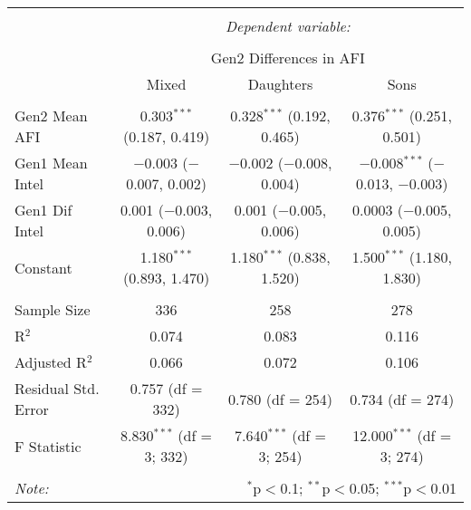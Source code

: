 
\begingroup 
\small 
\begin{tabular}{@{\extracolsep{1pt}}lccc} 
\\[-1.8ex]\hline 
\hline \\[-1.8ex] 
 & \multicolumn{3}{c}{\textit{Dependent variable:}} \\ 
\cline{2-4} 
\\[-1.8ex] & \multicolumn{3}{c}{Gen2 Differences in AFI} \\ 
 & Mixed & Daughters & Sons \\ 
\hline \\[-1.8ex] 
 Gen2 Mean AFI & 0.303$^{***}$ (0.187, 0.419) & 0.328$^{***}$ (0.192, 0.465) & 0.376$^{***}$ (0.251, 0.501) \\ 
  Gen1 Mean Intel & $-$0.003 ($-$0.007, 0.002) & $-$0.002 ($-$0.008, 0.004) & $-$0.008$^{***}$ ($-$0.013, $-$0.003) \\ 
  Gen1 Dif Intel & 0.001 ($-$0.003, 0.006) & 0.001 ($-$0.005, 0.006) & 0.0003 ($-$0.005, 0.005) \\ 
  Constant & 1.180$^{***}$ (0.893, 1.470) & 1.180$^{***}$ (0.838, 1.520) & 1.500$^{***}$ (1.180, 1.830) \\ 
 \hline \\[-1.8ex] 
Sample Size & 336 & 258 & 278 \\ 
R$^{2}$ & 0.074 & 0.083 & 0.116 \\ 
Adjusted R$^{2}$ & 0.066 & 0.072 & 0.106 \\ 
Residual Std. Error & 0.757 (df = 332) & 0.780 (df = 254) & 0.734 (df = 274) \\ 
F Statistic & 8.830$^{***}$ (df = 3; 332) & 7.640$^{***}$ (df = 3; 254) & 12.000$^{***}$ (df = 3; 274) \\ 
\hline 
\hline \\[-1.8ex] 
\textit{Note:}  & \multicolumn{3}{r}{$^{*}$p$<$0.1; $^{**}$p$<$0.05; $^{***}$p$<$0.01} \\ 
\end{tabular} 
\endgroup 
